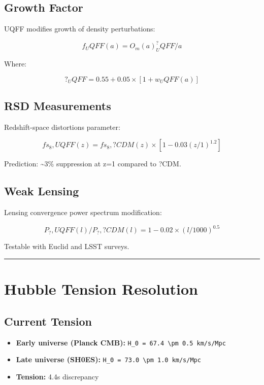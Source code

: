\documentclass[12pt,a4paper]{article}
\begin{document}
\subsection{Growth Factor}

UQFF modifies growth of density perturbations:

\begin{equation}
f_UQFF(a) = O_m(a)^?_UQFF / a
\end{equation}

Where:

\begin{equation}
?_UQFF = 0.55 + 0.05 \times [1 + w_UQFF(a)]
\end{equation}

\subsection{RSD Measurements}

Redshift-space distortions parameter:

\begin{equation}
fs_8,UQFF(z) = fs_8,?CDM(z) \times [1 - 0.03 (z/1)^1.2]
\end{equation}

Prediction: \textasciitilde{}3\% suppression at z=1 compared to ?CDM.

\subsection{Weak Lensing}

Lensing convergence power spectrum modification:

\begin{equation}
P_?,UQFF(l) / P_?,?CDM(l) = 1 - 0.02 \times (l/1000)^0.5
\end{equation}

Testable with Euclid and LSST surveys.

\medskip\hrule\medskip

\section{Hubble Tension Resolution}

\subsection{Current Tension}

\begin{itemize}
  \item \textbf{Early universe (Planck CMB):} \texttt{H\_0 = 67.4 \textbackslash pm 0.5 km/s/Mpc}
  \item \textbf{Late universe (SH0ES):} \texttt{H\_0 = 73.0 \textbackslash pm 1.0 km/s/Mpc}
  \item \textbf{Tension:} 4.4s discrepancy
\end{itemize}
\end{document}
